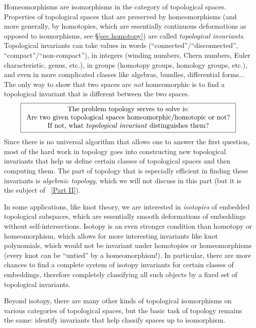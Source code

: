 Homeomorphisms are isomorphisms in the category of topological spaces. Properties of topological spaces that are preserved by homeomorphisms (and more generally, by homotopies, which are essentially continuous deformations as opposed to isomorphisms, see \S\ref{sec.homotopy}) are called \emph{topological invariants}. Topological invariants can take values in words (``connected''/``disconnected'', ``compact''/``non-compact''), in integers (winding numbers, Chern numbers, Euler characteristic, genus, etc.), in groups (homotopy groups, homology groups, etc.), and even in more complicated classes like algebras, bundles, differential forms... The only way to show that two spaces are \emph{not} homeomorphic is to find a topological invariant that is different between the two spaces.
\begin{gather*}
    \boxed{\begin{array}{c}
    \text{The problem topology serves to solve is:}\\
    \text{Are two given topological spaces homeomorphic/homotopic or not?}\\
    \text{If not, what \emph{topological invariant} distinguishes them?}
    \end{array}}
\end{gather*}
Since there is no universal algorithm that allows one to answer the first question, most of the hard work in topology goes into constructing new topological invariants that help us define certain classes of topological spaces and then computing them. The part of topology that is especially efficient in finding these invariants is \emph{algebraic topology}, which we will not discuss in this part (but it is the subject of \Part~\ref{Part II}).

\begin{rem}
    In some applications, like knot theory, we are interested in \emph{isotopies} of embedded topological subspaces, which are essentially smooth deformations of embeddings without self-intersections. Isotopy is an even stronger condition than homotopy or homeomorphism, which allows for more interesting invariants like knot polynomials, which would not be invariant under homotopies or homeomorphisms (every knot can be ``untied'' by a homeomorphism!). In particular, there are more chances to find a complete system of isotopy invariants for certain classes of embeddings, therefore completely classifying all such objects by a fixed set of topological invariants. 
    
    Beyond isotopy, there are many other kinds of topological isomorphisms on various categories of topological spaces, but the basic task of topology remains the same: identify invariants that help classify spaces up to isomorphism.
\end{rem}


